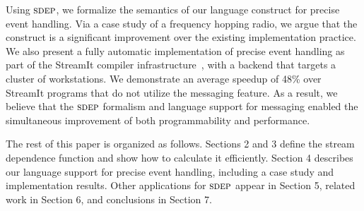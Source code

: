 Using $\textsc{sdep}$, we formalize the semantics of our language construct
for precise event handling.  Via a case study of a frequency hopping
radio, we argue that the construct is a significant improvement over
the existing implementation practice.  We also present a fully
automatic implementation of precise event handling as part of the
StreamIt compiler infrastructure~\cite{streamit-asplos, streamitcc},
with a backend that targets a cluster of workstations.  We demonstrate
an average speedup of 48\% over StreamIt programs that do not utilize
the messaging feature.  As a result, we believe that the $\textsc{sdep}$
formalism and language support for messaging enabled the simultaneous
improvement of both programmability and performance.

The rest of this paper is organized as follows.  Sections 2 and 3
define the stream dependence function and show how to calculate it
efficiently.  Section 4 describes our language support for precise
event handling, including a case study and implementation results.
Other applications for $\textsc{sdep}$ appear in Section 5, related work in
Section 6, and conclusions in Section 7.


				   
